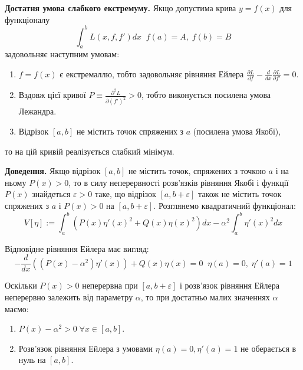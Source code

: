 \documentclass[14pt]{extarticle}
\newcommand{\<}{\langle}
\renewcommand{\>}{\rangle}
\theoremstyle{mystyle}{\newtheorem{definition}{Definition}[section]}
\theoremstyle{mystyle}{\newtheorem{proposition}[definition]{Proposition}}
\theoremstyle{mystyle}{\newtheorem{theorem}[definition]{Theorem}}
\theoremstyle{mystyle}{\newtheorem{lemma}[definition]{Lemma}}
\theoremstyle{mystyle}{\newtheorem{corollary}[definition]{Corollary}}
\theoremstyle{mystyle}{\newtheorem*{remark}{Remark}}
\theoremstyle{mystyle}{\newtheorem*{remarks}{Remarks}}
\theoremstyle{mystyle}{\newtheorem*{example}{Example}}
\theoremstyle{mystyle}{\newtheorem*{examples}{Examples}}
\theoremstyle{definition}{\newtheorem*{exercise}{Exercise}}
\theoremstyle{cstyle}{\newtheorem*{cthm}{}}
\theoremstyle{warn}
\begin{document}
\begin{theorem}
    \textbf{Достатня умова слабкого екстремуму.} Якщо допустима крива $y=f(x)$ для функціоналу
    \begin{equation}
        \int_a^b L(x,f,f')dx \; \; f(a)=A, \; f(b)=B
    \end{equation}
    задовольняє наступним умовам:
    \begin{enumerate}
        \item $f=f(x)$ є екстремаллю, тобто задовольняє рівняння Ейлера $\frac{\partial L}{\partial f} - \frac{d}{dx}\frac{\partial L}{\partial f'} = 0$.
        \item Вздовж цієї кривої $P \equiv \frac{\partial^2 L}{\partial (f')^2} > 0$, тобто виконується посилена умова Лежандра.
        \item Відрізок $[a,b]$ не містить точок спряжених з $a$ (посилена умова Якобі),
    \end{enumerate}

    то на цій кривій реалізується слабкий мінімум.
\end{theorem}

\textbf{Доведення.} Якщо відрізок $[a,b]$ не містить точок, спряжених з точкою $a$ і на ньому $P(x)>0$, то в силу неперервності розв'язків рівняння Якобі і функції $P(x)$ знайдеться 
$\varepsilon>0$ таке, що відрізок $[a,b+\varepsilon]$ також не містить точок спряжених з $a$ і $P(x)>0$ на $[a,b+\varepsilon]$. Розглянемо квадратичний функціонал:
\begin{equation}
    V[\eta] := \int_a^b (P(x)\eta'(x)^2 + Q(x)\eta(x)^2)dx - \alpha^2\int_a^b \eta'(x)^2dx
\end{equation}

Відповідне рівняння Ейлера має вигляд:
\begin{equation}
    -\frac{d}{dx}\left((P(x)-\alpha^2)\eta'(x)\right) + Q(x)\eta(x) = 0 \; \; \eta(a)=0, \; \eta'(a)=1
\end{equation}

Оскільки $P(x)>0$ неперервна при $[a,b+\varepsilon]$ і розв'язок рівняння Ейлера неперервно залежить від параметру $\alpha$, то при достатньо 
малих значеннях $\alpha$ маємо:
\begin{enumerate}
    \item $P(x)-\alpha^2>0 \; \forall x \in [a,b]$.
    \item Розв'язок рівняння Ейлера з умовами $\eta(a)=0,\eta'(a)=1$ не оберається в нуль на $[a,b]$.
\end{enumerate}
\end{document}
